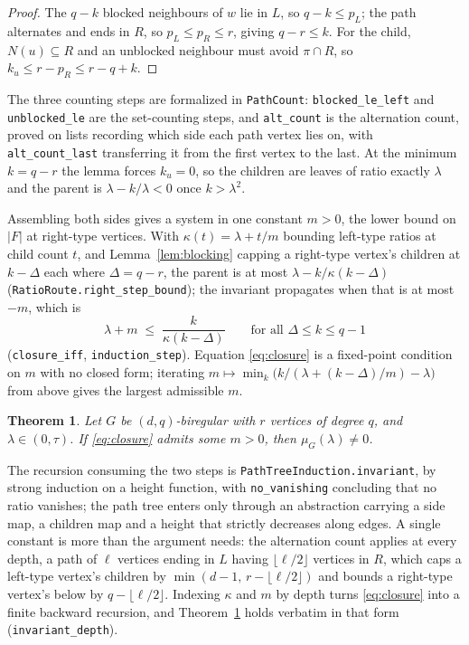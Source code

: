 \documentclass[11pt]{article}
\newtheorem{theorem}{Theorem}
\theoremstyle{remark}
\begin{document}
\begin{proof}
The $q-k$ blocked neighbours of $w$ lie in $L$, so $q-k\le p_L$; the path alternates and ends in
$R$, so $p_L\le p_R\le r$, giving $q-r\le k$. For the child, $N(u)\subseteq R$ and an unblocked
neighbour must avoid $\pi\cap R$, so $k_u\le r-p_R\le r-q+k$.
\end{proof}

The three counting steps are formalized in \texttt{PathCount}: \texttt{blocked\_le\_left} and
\texttt{unblocked\_le} are the set-counting steps, and \texttt{alt\_count} is the alternation
count, proved on lists recording which side each path vertex lies on, with
\texttt{alt\_count\_last} transferring it from the first vertex to the last. At the minimum
$k=q-r$ the lemma forces $k_u=0$, so the children are leaves of ratio exactly $\lambda$ and the
parent is $\lambda-k/\lambda<0$ once $k>\lambda^2$.

Assembling both sides gives a system in one constant $m>0$, the lower bound on $|F|$ at
right-type vertices. With $\kappa(t)=\lambda+t/m$ bounding left-type ratios at child count $t$,
and Lemma~\ref{lem:blocking} capping a right-type vertex's children at $k-\Delta$ each where
$\Delta=q-r$, the parent is at most $\lambda-k/\kappa(k-\Delta)$
(\texttt{RatioRoute.right\_step\_bound}); the invariant propagates when that is at most $-m$,
which is
\begin{equation}\label{eq:closure}
   \lambda+m\;\le\;\frac{k}{\kappa(k-\Delta)}\qquad\text{for all }\Delta\le k\le q-1
\end{equation}
(\texttt{closure\_iff}, \texttt{induction\_step}). Equation \eqref{eq:closure} is a fixed-point
condition on $m$ with no closed form; iterating
$m\mapsto\min_k\bigl(k/(\lambda+(k-\Delta)/m)-\lambda\bigr)$ from above gives the largest
admissible $m$.

\begin{theorem}\label{thm:biregclass}
Let $G$ be $(d,q)$-biregular with $r$ vertices of degree $q$, and $\lambda\in(0,\tau)$. If
\eqref{eq:closure} admits some $m>0$, then $\mu_G(\lambda)\neq0$.
\end{theorem}

The recursion consuming the two steps is \texttt{PathTreeInduction.invariant}, by strong induction
on a height function, with \texttt{no\_vanishing} concluding that no ratio vanishes; the path tree
enters only through an abstraction carrying a side map, a children map and a height that strictly
decreases along edges. A single constant is more than the argument needs: the alternation count
applies at every depth, a path of $\ell$ vertices ending in $L$ having $\lfloor\ell/2\rfloor$
vertices in $R$, which caps a left-type vertex's children by
$\min(d-1,\,r-\lfloor\ell/2\rfloor)$ and bounds a right-type vertex's below by
$q-\lfloor\ell/2\rfloor$. Indexing $\kappa$ and $m$ by depth turns \eqref{eq:closure} into a
finite backward recursion, and Theorem~\ref{thm:biregclass} holds verbatim in that form
(\texttt{invariant\_depth}).
\end{document}
